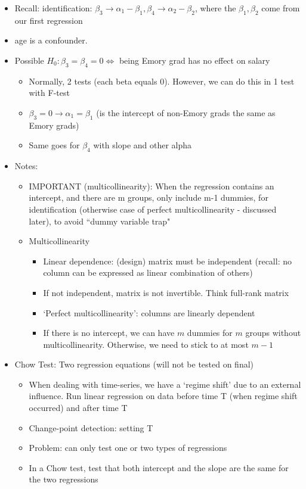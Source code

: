 \documentclass[10pt, oneside]{article}
\begin{document}
\begin{itemize}
    \item Recall: identification: $\beta_3 \rightarrow \alpha_1 - \beta_1, \beta_4 \rightarrow \alpha_2 - \beta_2$, where the $\beta_1, \beta_2$ come from our first regression
    \item age is a confounder. 
    \item Possible $H_0: \beta_3 = \beta_4 = 0 \Leftrightarrow$ being Emory grad has no effect on salary
    \begin{itemize}
        \item Normally, 2 tests (each beta equals 0). However, we can do this in 1 test with F-test
        \item $\beta_3 = 0 \rightarrow \alpha_1 = \beta_1$ (is the intercept of non-Emory grads the same as Emory grads)
        \item Same goes for $\beta_4$ with slope and other alpha
    \end{itemize}
    \item Notes:
    \begin{itemize}
        \item IMPORTANT (multicollinearity): When the regression contains an intercept, and there are m groups, only include m-1 dummies, for identification (otherwise case of perfect multicollinearity - discussed later), to avoid ``dummy variable trap"
        \item Multicollinearity
        \begin{itemize}
            \item Linear dependence: (design) matrix must be independent (recall: no column can be expressed as linear combination of others)
            \item If not independent, matrix is not invertible. Think full-rank matrix
            \item `Perfect multicollinearity': columns are linearly dependent
            \item If there is no intercept, we can have $m$ dummies for $m$ groups without multicollinearity. Otherwise, we need to stick to at most $m-1$
        \end{itemize}
    \end{itemize}
    \item Chow Test: Two regression equations (will not be tested on final)
    \begin{itemize}
        \item When dealing with time-series, we have a `regime shift' due to an external influence. Run linear regression on data before time T (when regime shift occurred) and after time T
        \item Change-point detection: setting T
        \item Problem: can only test one or two types of regressions
        \item In a Chow test, test that both intercept and the slope are the same for the two regressions
    \end{itemize}
\end{itemize}
\end{document}
